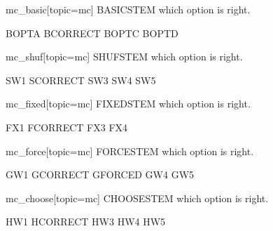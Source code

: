 
\begin{problem}{mc_basic}[topic=mc]
	BASICSTEM which option is right.
	\begin{choices}
		\choice BOPTA
		\cchoice BCORRECT
		\choice BOPTC
		\choice BOPTD
	\end{choices}
\end{problem}

\begin{problem}{mc_shuf}[topic=mc]
	SHUFSTEM which option is right.
	\begin{choices}
		\choice SW1
		\cchoice SCORRECT
		\choice SW3
		\choice SW4
		\choice SW5
	\end{choices}
\end{problem}

\begin{problem}{mc_fixed}[topic=mc]
	FIXEDSTEM which option is right.
	\begin{choices}[fixed]
		\choice FX1
		\cchoice FCORRECT
		\choice FX3
		\choice FX4
	\end{choices}
\end{problem}

\begin{problem}{mc_force}[topic=mc]
	FORCESTEM which option is right.
	\begin{choices}
		\choice GW1
		\cchoice GCORRECT
		\fchoice[3] GFORCED
		\choice GW4
		\choice GW5
	\end{choices}
\end{problem}

\begin{problem}{mc_choose}[topic=mc]
	CHOOSESTEM which option is right.
	\begin{choices}[choose=3]
		\choice HW1
		\cchoice HCORRECT
		\choice HW3
		\choice HW4
		\choice HW5
	\end{choices}
\end{problem}
